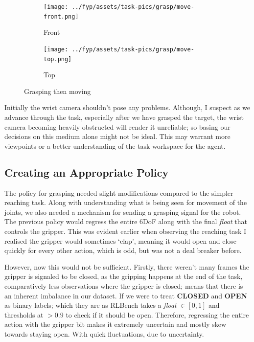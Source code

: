 \begin{figure}[htpb] %
  \centering
  \begin{subfigure}{0.45\linewidth}
    \centering
    \texttt{[image: ../fyp/assets/task-pics/grasp/move-front.png]} 
    \caption{Front}\label{subfig:grasp-move-front}
  \end{subfigure}
  \begin{subfigure}{0.45\linewidth}
    \centering
    \texttt{[image: ../fyp/assets/task-pics/grasp/move-top.png]}
    \caption{Top}\label{subfig:grasp-move-top}
  \end{subfigure}
  \caption{Grasping then moving}\label{fig:grasp-move}
\end{figure}




Initially the wrist camera shouldn't pose any problems. Although, I suspect as we advance through the task, especially after we have grasped the target, the wrist camera becoming heavily obstructed will render it unreliable; so basing our decisions on this medium alone might not be ideal. This may warrant more viewpoints or a better understanding of the task workspace for the agent. 

\subsection{Creating an Appropriate Policy}
The policy for grasping needed slight modifications compared to the simpler reaching task. Along with understanding what is being seen for movement of the joints, we also needed a mechanism for sending a grasping signal for the robot. The previous policy would regress the entire 6DoF along with the final \emph{float} that controls the gripper. This was evident earlier when observing the reaching task I realised the gripper would sometimes `clap', meaning it would open and close quickly for every other action, which is odd, but was not a deal breaker before.

However, now this would not be sufficient. Firstly, there weren't many frames the gripper is signaled to be closed, as the gripping happens at the end of the task, comparatively less observations where the gripper is closed; means that there is an inherent imbalance in our dataset. If we were to treat \textbf{CLOSED} and \textbf{OPEN} as binary labels; which they are as RLBench takes a \emph{float} $\in \left[0, 1\right]$ and thresholds at $ > 0.9$ to check if it should be open. Therefore, regressing the entire action with the gripper bit makes it extremely uncertain and mostly skew towards staying open. With quick fluctuations, due to uncertainty.

